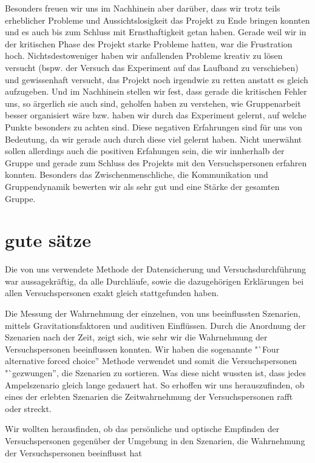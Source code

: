 \documentclass{Bericht}
\begin{document}
Besonders freuen wir uns im Nachhinein aber darüber, dass wir trotz teils erheblicher Probleme und Aussichtslosigkeit das Projekt zu Ende bringen konnten und es auch bis zum Schluss mit Ernsthaftigkeit getan haben. Gerade weil wir in der kritischen Phase des Projekt starke Probleme hatten, war die Frustration hoch. Nichtsdestoweniger haben wir anfallenden Probleme kreativ zu lösen versucht (bspw. der Versuch das Experiment auf das Laufband zu verschieben) und gewissenhaft versucht, das Projekt noch irgendwie zu retten anstatt es gleich aufzugeben. Und im Nachhinein stellen wir fest, dass gerade die kritischen Fehler uns, so ärgerlich sie auch sind, geholfen haben zu verstehen, wie Gruppenarbeit besser organisiert wäre bzw. haben wir durch das Experiment gelernt, auf welche Punkte besonders zu achten sind. Diese negativen Erfahrungen sind für uns von Bedeutung, da wir gerade auch durch diese viel gelernt haben.
Nicht unerwähnt sollen allerdings auch die positiven Erfahungen sein, die wir innherhalb der Gruppe und gerade zum Schluss des Projekts mit den Versuchspersonen erfahren konnten. Besonders das Zwischenmenschliche, die Kommunikation und Gruppendynamik bewerten wir als sehr gut und eine Stärke der gesamten Gruppe. 


\section{gute sätze}
 Die von uns verwendete Methode der Datensicherung und Versuchsdurchführung war aussagekräftig, da alle Durchläufe, sowie die dazugehörigen Erklärungen bei allen Versuchspersonen exakt gleich stattgefunden haben.



Die Messung der Wahrnehmung der einzelnen, von uns beeinflussten Szenarien, mittels Gravitationsfaktoren und auditiven Einflüssen. Durch die Anordnung der Szenarien nach der Zeit, zeigt sich, wie sehr wir die Wahrnehmung der Versuchspersonen beeinflussen konnten.  Wir haben die sogenannte "`Four alternative forced choice'' Methode verwendet und somit die Versuchspersonen "`gezwungen'', die Szenarien zu sortieren. Was diese nicht wussten ist, dass jedes Ampelszenario gleich lange gedauert hat. So erhoffen wir uns herauszufinden, ob eines der erlebten Szenarien die Zeitwahrnehmung der Versuchspersonen rafft oder streckt.	




Wir wollten herausfinden, ob das persönliche und optische Empfinden der Versuchspersonen gegenüber der Umgebung in den Szenarien, die Wahrnehmung der Versuchspersonen beeinflusst hat
\end{document}
